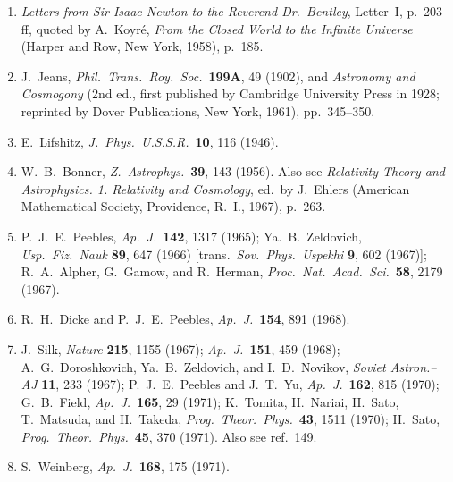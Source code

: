 \begin{enumerate}
  \item{}\label{ch15-ref-143}
  \emph{Letters from Sir Isaac Newton to the Reverend Dr.\ Bentley},
  Letter~I, p.~203 ff, quoted by A.~Koyr\'e,
  \emph{From the Closed World to the Infinite Universe}
  (Harper and Row, New York, 1958), p.~185.

  \item{}\label{ch15-ref-144}
  J.~Jeans, \emph{Phil.\ Trans.\ Roy.\ Soc.}\ \textbf{199A}, 49 (1902),
  and \emph{Astronomy and Cosmogony}
  (2nd ed., first published by Cambridge University Press in 1928;
  reprinted by Dover Publications, New York, 1961), pp.~345--350.

  \item{}\label{ch15-ref-145}
  E.~Lifshitz, \emph{J.\ Phys.\ U.S.S.R.}\ \textbf{10}, 116 (1946).

  \item{}\label{ch15-ref-146}
  W.~B.~Bonner, \emph{Z.\ Astrophys.}\ \textbf{39}, 143 (1956).
  Also see \emph{Relativity Theory and Astrophysics.
  1. Relativity and Cosmology}, ed.\ by J.~Ehlers
  (American Mathematical Society, Providence, R.~I., 1967), p.~263.

  \item{}\label{ch15-ref-147}
  P.~J.~E.~Peebles, \emph{Ap.\ J.}\ \textbf{142}, 1317 (1965);
  Ya.~B.~Zeldovich, \emph{Usp.\ Fiz.\ Nauk} \textbf{89}, 647 (1966)
  [trans.\ \emph{Sov.\ Phys.\ Uspekhi} \textbf{9}, 602 (1967)];
  R.~A.~Alpher, G.~Gamow, and R.~Herman,
  \emph{Proc.\ Nat.\ Acad.\ Sci.}\ \textbf{58}, 2179 (1967).

  \item[147a.]\label{ch15-ref-147a}
  R.~H.~Dicke and P.~J.~E.~Peebles,
  \emph{Ap.\ J.}\ \textbf{154}, 891 (1968).

  \item{}\label{ch15-ref-148}
  J.~Silk, \emph{Nature} \textbf{215}, 1155 (1967);
  \emph{Ap.\ J.}\ \textbf{151}, 459 (1968);
  A.~G.~Doroshkovich, Ya.~B.~Zeldovich, and I.~D.~Novikov,
  \emph{Soviet Astron.--AJ} \textbf{11}, 233 (1967);
  P.~J.~E.~Peebles and J.~T.~Yu,
  \emph{Ap.\ J.}\ \textbf{162}, 815 (1970);
  G.~B.~Field, \emph{Ap.\ J.}\ \textbf{165}, 29 (1971);
  K.~Tomita, H.~Nariai, H.~Sato, T.~Matsuda, and H.~Takeda,
  \emph{Prog.\ Theor.\ Phys.}\ \textbf{43}, 1511 (1970);
  H.~Sato, \emph{Prog.\ Theor.\ Phys.}\ \textbf{45}, 370 (1971).
  Also see ref.~149.

  \item{}\label{ch15-ref-149}
  S.~Weinberg, \emph{Ap.\ J.}\ \textbf{168}, 175 (1971).


\end{enumerate}
